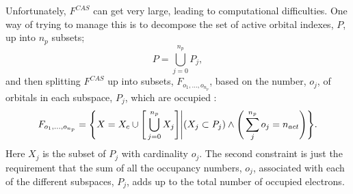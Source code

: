 \documentclass[12pt]{article}
\begin{document}
\noindent Unfortunately, $F^{CAS}$ can get very large, leading to computational difficulties. 
One way of trying to manage this is to decompose the set of active orbital indexes, $P$, up into $n_{p}$ subsets;
\begin{equation}
P = \bigcup\limits_{j=0}^{n_{p}} P_{j}, 
\end{equation}
and then splitting $F^{CAS}$ up into subsets, $F_{o_{1},...,o_{n_{p}}}$, based on the 
number, $o_{j}$, of orbitals in each subspace, $P_{j}$, which are occupied : 
\begin{equation}
F_{o_{1},...,o_{n_{p}}} =
\Bigg{\{} X =   X_{c} \cup \Bigg{[} \bigcup\limits_{j=0}^{n_{p}} X_{j}\Bigg{]}
 \Bigg{|} ( X_{j} \subset P_{j} ) \wedge \Bigg{(} \sum_{j}^{n_{p}} o_{j}  = n_{act} \Bigg{)}\Bigg{\}} . 
\end{equation}
Here $X_{j}$ is the subset of $P_{j}$ with cardinality $o_{j}$. The second constraint
is just the requirement that the sum of all the occupancy numbers, $o_{j}$, associated
with each of the different subspaces, $P_{j}$, adds up to the total number of
occupied electrons.\\ 
\end{document}
